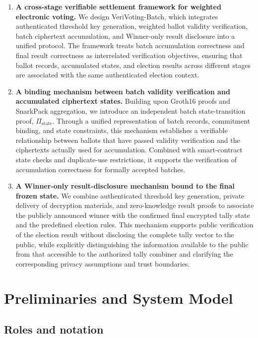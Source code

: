 \documentclass[pdflatex,sn-mathphys-num]{sn-jnl}%
\theoremstyle{thmstyleone}%
\theoremstyle{thmstyletwo}%
\theoremstyle{thmstylethree}%
\begin{document}
\begin{enumerate}
\item \textbf{A cross-stage verifiable settlement framework for weighted electronic
voting.} We design VeriVoting-Batch, which integrates authenticated threshold key
generation, weighted ballot validity verification, batch ciphertext accumulation, and
Winner-only result disclosure into a unified protocol. The framework treats batch
accumulation correctness and final result correctness as interrelated verification
objectives, ensuring that ballot records, accumulated states, and election results
across different stages are associated with the same authenticated election context.

\item \textbf{A binding mechanism between batch validity verification and accumulated
ciphertext states.} Building upon Groth16 proofs and SnarkPack aggregation, we introduce
an independent batch state-transition proof, \(\Pi_{\mathrm{state}}\). Through a unified
representation of batch records, commitment binding, and state constraints, this
mechanism establishes a verifiable relationship between ballots that have passed
validity verification and the ciphertexts actually used for accumulation. Combined with
smart-contract state checks and duplicate-use restrictions, it supports the verification
of accumulation correctness for formally accepted batches.

\item \textbf{A Winner-only result-disclosure mechanism bound to the final frozen
state.} We combine authenticated threshold key generation, private delivery of
decryption materials, and zero-knowledge result proofs to associate the publicly
announced winner with the confirmed final encrypted tally state and the predefined
election rules. This mechanism supports public verification of the election result
without disclosing the complete tally vector to the public, while explicitly
distinguishing the information available to the public from that accessible to the
authorized tally combiner and clarifying the corresponding privacy assumptions and trust
boundaries.
\end{enumerate}

\section{Preliminaries and System Model}\label{sec2}

\subsection{Roles and notation}\label{sec2.1}
\end{document}
